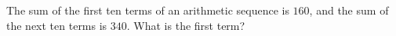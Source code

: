 The sum of the first ten terms of an arithmetic sequence is $160$, and the sum of the next ten terms is $340$. What is the first term?
